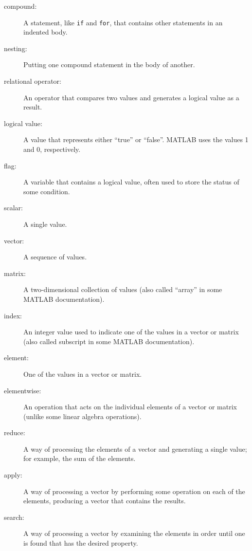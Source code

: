 \documentclass[
]{book}
\begin{document}
\begin{description}

\item[compound:] A statement, like {\tt if} and {\tt for}, that
contains other statements in an indented body.

\item[nesting:] Putting one compound statement in the body of another.

\item[relational operator:] An operator that compares two values and
generates a logical value as a result.

\item[logical value:] A value that represents either ``true'' or
``false''.  MATLAB uses the values 1 and 0, respectively.

\item[flag:] A variable that contains a logical value, often used
to store the status of some condition.

\item[scalar:] A single value.

\item[vector:] A sequence of values.

\item[matrix:] A two-dimensional collection of values (also called
``array'' in some MATLAB documentation).

\item[index:] An integer value used to indicate one of the values
in a vector or matrix (also called subscript in some MATLAB documentation).

\item[element:] One of the values in a vector or matrix.

\item[elementwise:] An operation that acts on the individual elements
of a vector or matrix (unlike some linear algebra operations).

\item[reduce:] A way of processing the elements of a vector and
generating a single value; for example, the sum of the elements.

\item[apply:] A way of processing a vector by performing some operation
on each of the elements, producing a vector that contains the
results.

\item[search:] A way of processing a vector by examining the
elements in order until one is found that has the desired property.

\end{description}
\end{document}
